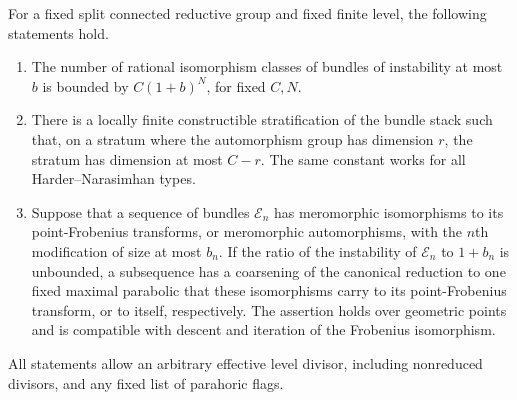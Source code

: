 \begin{proposition}
\label{amp:geometry}
For a fixed split connected reductive group and fixed finite level,
the following statements hold.
\begin{enumerate}[label=(\alph*)]
\item The number of rational isomorphism classes of bundles of
instability at most $b$ is bounded by $C(1+b)^N$, for fixed $C,N$.
\item There is a locally finite constructible stratification of the
bundle stack such that, on a stratum where the automorphism group has
dimension $r$, the stratum has dimension at most $C-r$.
The same constant works for all Harder--Narasimhan types.
\item Suppose that a sequence of bundles $\mathcal E_n$ has
meromorphic isomorphisms to its point-Frobenius transforms, or
meromorphic automorphisms, with the $n$th modification of size at
most $b_n$.  If the ratio of the instability of $\mathcal E_n$ to
$1+b_n$ is unbounded, a subsequence has a coarsening of the canonical
reduction to one fixed maximal parabolic that these isomorphisms
carry to its point-Frobenius transform, or to itself, respectively.
The assertion holds over geometric points and is
compatible with descent and iteration of the Frobenius isomorphism.
\end{enumerate}
All statements allow an arbitrary effective level divisor, including
nonreduced divisors, and any fixed list of parahoric flags.
\end{proposition}

